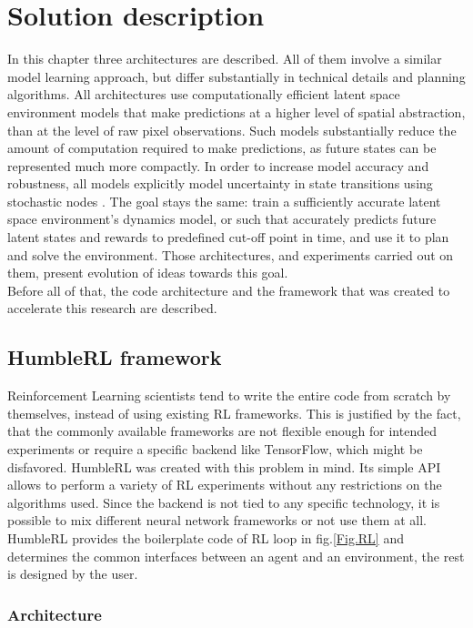 \section{Solution description}

In this chapter three architectures are described. All of them involve a similar model learning approach, but differ substantially in technical details and planning algorithms. All architectures use computationally efficient latent space environment models that make predictions at a higher level of spatial abstraction, than at the level of raw pixel observations. Such models substantially reduce the amount of computation required to make predictions, as future states can be represented much more compactly. In order to increase model accuracy and robustness, all models explicitly model uncertainty in state transitions using stochastic nodes \cite{Algo.FastGenerativeModels}.
The goal stays the same: train a sufficiently accurate latent space environment's dynamics model, or such that accurately predicts future latent states and rewards to predefined cut-off point in time, and use it to plan and solve the environment. Those architectures, and experiments carried out on them, present evolution of ideas towards this goal. \\
Before all of that, the code architecture and the framework that was created to accelerate this research are described.

\subsection{HumbleRL framework}

Reinforcement Learning scientists tend to write the entire code from scratch by themselves, instead of using existing RL frameworks. This is justified by the fact, that the commonly available frameworks are not flexible enough for intended experiments or require a specific backend like TensorFlow, which might be disfavored.
HumbleRL \cite{Code.HRL} was created with this problem in mind. Its simple API allows to perform a variety of RL experiments without any restrictions on the algorithms used. Since the backend is not tied to any specific technology, it is possible to mix different neural network frameworks or not use them at all. HumbleRL provides the boilerplate code of RL loop in fig.\ref{Fig.RL} and determines the common interfaces between an agent and an environment, the rest is designed by the user.

\subsubsection{Architecture}

